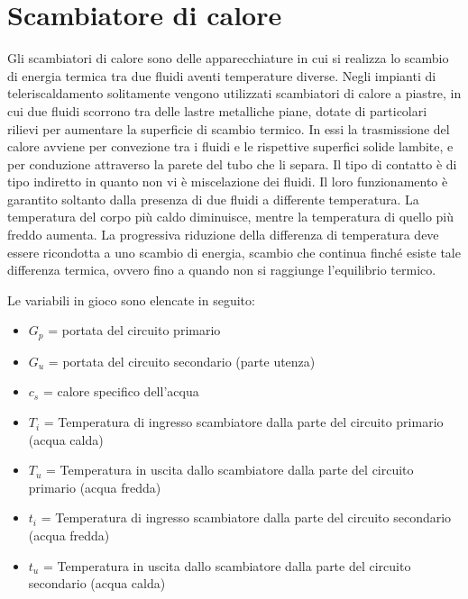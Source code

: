 \documentclass[laurea,oneside,11pt]{USiena_tesiLM3}
\begin{document}
\section{Scambiatore di calore}
\label{subsec:scambiatore_di_calore}
Gli scambiatori di calore sono  delle apparecchiature in cui si realizza lo scambio di energia termica tra due fluidi aventi temperature diverse. Negli impianti di teleriscaldamento solitamente vengono utilizzati scambiatori di calore a piastre, in cui due fluidi scorrono tra delle lastre metalliche piane, dotate di particolari rilievi per aumentare la superficie di scambio termico. In essi la trasmissione del calore avviene per convezione tra i fluidi e le rispettive superfici solide lambite,  e per conduzione attraverso la parete del tubo che li separa. Il tipo di contatto è di tipo indiretto in quanto non vi è miscelazione dei fluidi.
Il loro funzionamento è garantito soltanto dalla presenza di due fluidi a differente temperatura. La temperatura del corpo più caldo diminuisce, mentre la temperatura di quello più freddo aumenta. La progressiva riduzione della differenza di temperatura deve essere ricondotta a uno scambio di energia, scambio che continua finché esiste tale differenza termica, ovvero fino a quando non si raggiunge l'equilibrio termico. 

Le variabili in gioco sono elencate in seguito:
\begin{itemize}
\item[] $G_p$ = portata del circuito primario
\item[]$G_u$ = portata del circuito secondario (parte utenza)
\item[]$c_s$ = calore specifico dell'acqua
\item[]$T_i$ = Temperatura di ingresso scambiatore dalla parte del circuito primario (acqua calda)
\item[]$T_u$ = Temperatura in uscita dallo scambiatore dalla parte del circuito primario (acqua fredda)
\item[]$t_i$ = Temperatura di ingresso scambiatore dalla parte del circuito secondario (acqua fredda)
\item[]$t_u$ = Temperatura in uscita dallo scambiatore dalla parte del circuito secondario (acqua calda)
\end{itemize}
\end{document}
